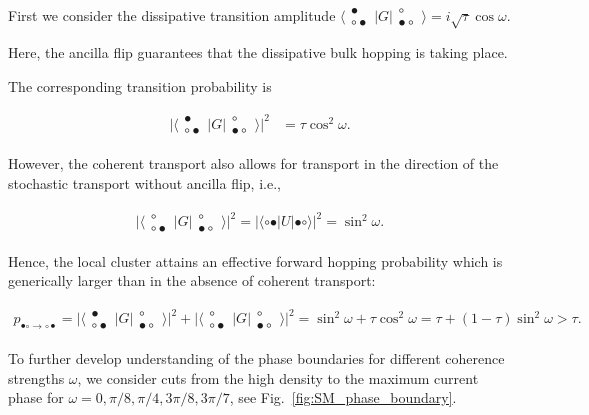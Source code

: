 \documentclass[aps,prl,twocolumn,groupedaddress,superscriptaddress,colorlinks,bookmarks=false,citecolor=darkspringgreen,linkcolor=darkolivegreen,urlcolor=navyblue]{revtex4-1}
\newcommand{\threestate}[3]{
\begin{matrix}
#1\\[-.25cm]
#2#3
\end{matrix}
}
\newcommand{\kett}[1]{\lvert #1 \rangle}
\newcommand{\brat}[1]{\langle #1 \rvert}
\begin{document}
First we consider the dissipative transition amplitude $\brat{\threestate{\bullet}{\circ}{\bullet}} G\kett{\threestate{\circ}{\bullet}{\circ}}=i\sqrt{\tau} \cos \omega$.

Here, the ancilla flip guarantees that the dissipative bulk hopping is taking place.

The corresponding transition probability is


\begin{align}
 \big|\brat{\threestate{\bullet}{\circ}{\bullet}}G \kett{\threestate{\circ}{\bullet}{\circ}}\big|^2
 &= \tau \cos^2 \omega.
\end{align}


However, the coherent transport also allows for transport in the direction of the stochastic transport without ancilla flip, i.e.,


\begin{align}
 \big|\brat{\threestate{\circ}{\circ}{\bullet}}G \kett{\threestate{\circ}{\bullet}{\circ}}\big|^2
 =\big|\brat{\circ \bullet} U \kett{\bullet \circ }\big|^2
 =\sin^2\omega.
\end{align}


Hence, the local cluster attains an effective forward hopping probability which is generically larger than in the absence of coherent transport:


\begin{align}
    p_{\bullet\circ\to\circ\bullet} =
    \big|\brat{\threestate{\bullet}{\circ}{\bullet}}G \kett{\threestate{\circ}{\bullet}{\circ}}\big|^2
    +
     \big|\brat{\threestate{\circ}{\circ}{\bullet}}G \kett{\threestate{\circ}{\bullet}{\circ}}\big|^2
     =
     \sin^2\omega + \tau \cos^2 \omega
     = \tau + (1-\tau)\sin^2\omega >\tau .
\end{align}



To further develop understanding of the phase boundaries for different coherence strengths $\omega$, we consider cuts from the high density to the maximum current phase for $\omega =0, \pi/8, \pi/4, 3\pi/8, 3\pi/7 $, see Fig.~\ref{fig:SM_phase_boundary}.
\end{document}
